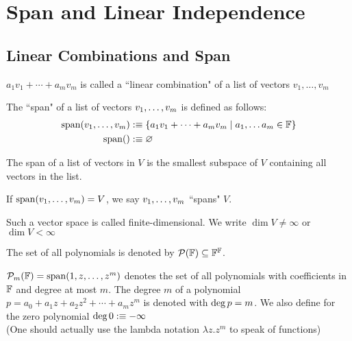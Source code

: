\section{Span and Linear Independence}
\subsection{Linear Combinations and Span}

\setcounter{thm}{1}
\begin{mydef} 
  $a_1 v_1 + \cdots + a_m v_m$ is called a ``linear combination" of a list of vectors $v_1, \dots, v_m$
\end{mydef}

\setcounter{thm}{3}
\begin{mydef} 
	The ``span" of a list of vectors $v_1, \dots, v_m$ is defined as follows:
  \begin{equation}
    \begin{aligned}
      \operatorname{span} (v_1, \dots, v_m) &:\equiv \{a_1 v_1 + \cdots + a_m v_m \mid a_1, \dots a_m \in \mathbb{F} \}\\
      \operatorname{span} ( ) &:\equiv \varnothing
    \end{aligned}
  \end{equation}
\end{mydef}

\setcounter{thm}{5}
\begin{thm} 
  The  span of a list of vectors in $V$ is the smallest subspace of $V$ containing all vectors in the list.
\end{thm}

\begin{mydef} 
  If $\operatorname{span} (v_1, \dots, v_m) = V$, we say $v_1, \dots, v_m$ ``spans" $V$.
\end{mydef}

\setcounter{thm}{8}
\begin{mydef} 
  Such a vector space is called finite-dimensional. We write $\dim V \neq \infty$ or $\dim V < \infty$
\end{mydef}

\begin{mydef}
  The set of all polynomials is denoted by $\mathcal{P} (\mathbb{F}) \subseteq \mathbb{F}^{\mathbb{F}}$.
\end{mydef}
\begin{mydef}
  $\mathcal{P}_m (\mathbb{F} )=\operatorname{span} (1,z,\dots,z^m)$ denotes the set of all polynomials with coefficients in $\mathbb{F}$ and degree at most $m$. The degree $m$ of a polynomial $p=a_0+a_1z+a_2z^2+\cdots+a_mz^m$ is denoted with ${\operatorname{deg} \,} p=m$.
  We also define for the zero polynomial ${\operatorname{deg} \,} 0 : \equiv -\infty$ \\
  (One should actually use the lambda notation $\lambda z.z^m$ to speak of functions)
\end{mydef}

